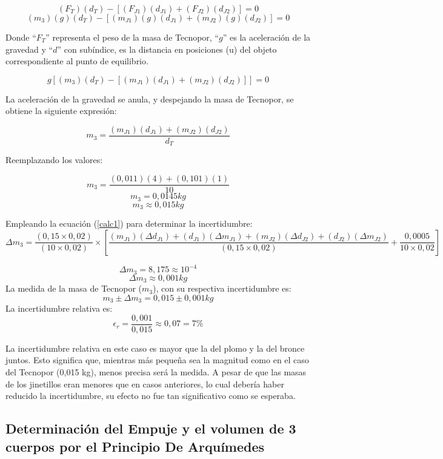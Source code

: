 \documentclass[../main.tex]{subfiles}
\begin{document}
\[(F_T)(d_T )-[(F_{J1} )(d_{J1} )+(F_{J2} )(d_{J2} )]=0\]
\[(m_3)(g)(d_T )-[(m_{J1} )(g)(d_{J1} )+(m_{J2} )(g)(d_{J2} )]=0\]

Donde “$F_T$” representa el peso de la masa de Tecnopor, “$g$”
es la aceleración de la gravedad y “$d$” con subíndice,
es la distancia en posiciones (u) del objeto correspondiente al 
punto de equilibrio.

\[g[(m_3)(d_T )-[(m_{J1} )(d_{J1} )+(m_{J2} )(d_{J2} )]]=0\]

La aceleración de la gravedad se anula, y despejando la masa de 
Tecnopor, 
se obtiene la siguiente expresión:

\begin{equation*}
    m_3=\frac{(m_{J1} )(d_{J1} )+(m_{J2} )(d_{J2} )}{d_T} 
\end{equation*}

Reemplazando los valores:

\[m_3=\frac{(0,011)(4)+(0,101)(1)}{10}\]
\[m_3=0,0145 kg\]
\[m_3\approx0,015 kg\]

Empleando la ecuación (\ref{calc1}) para determinar la incertidumbre:
\begin{equation*}
    \Delta m_3=\frac{(0,15×0,02)}{(10×0,02)}\times
    \left[\frac{(m_{J1} )(\Delta d_{J1} )+(d_{J1} )(\Delta m_{J1} )+
    (m_{J2} )(\Delta d_{J2} )+(d_{J2} )(\Delta m_{J2} )}{(0,15\times0,02)}
    +\frac{0,0005}{10\times0,02}\right]
\end{equation*}

\[\Delta m_3=8,175\approx10^{-4}\]
\[\Delta m_3\approx0,001 kg\]
La medida de la masa de Tecnopor ($m_3$), 
con su respectiva incertidumbre es:
\[m_3\pm\Delta m_3=0,015\pm0,001 kg\]
La incertidumbre relativa es:
\[\epsilon_r=\frac{0,001}{0,015}\approx0,07=7\%\]

La incertidumbre relativa en este caso es mayor que la del plomo 
y la del bronce juntos. Esto significa que, mientras más 
pequeña sea la magnitud como en el caso del 
Tecnopor (0,015 kg), menos precisa será la medida. 
A pesar de que las masas de los jinetillos eran menores que en 
casos anteriores, lo cual debería haber reducido la incertidumbre, 
su efecto no fue tan significativo como se esperaba.

\subsection{Determinación del Empuje y el volumen de 3 cuerpos por el Principio De Arquímedes}
\end{document}
